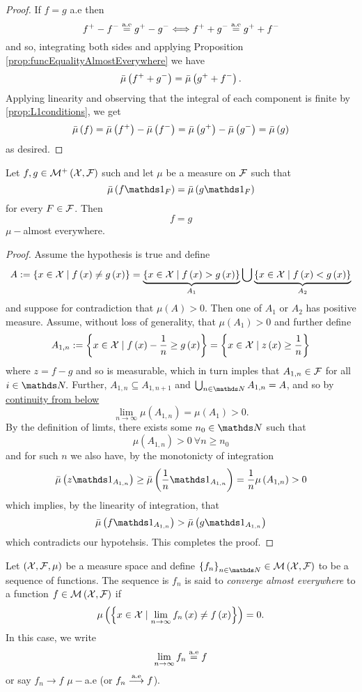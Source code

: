 \begin{proof}
If $f=g$ a.e then
\[
f^{+}-f^{-}\stackrel{\textnormal{a.e}}{=}g^{+}-g^{-}\Longleftrightarrow f^{+}+g^{-}\stackrel{\textnormal{a.e}}{=}g^{+}+f^{-}
\]
and so, integrating both sides and applying Proposition \ref{prop:funcEqualityAlmostEverywhere}
we have
\[
\bar{\mu}\left(f^{+}+g^{-}\right)=\bar{\mu}\left(g^{+}+f^{-}\right).
\]
Applying linearity and observing that the integral of each component
is finite by \ref{prop:L1conditions}, we get 
\[
\bar{\mu}\left(f\right)=\bar{\mu}\left(f^{+}\right)-\bar{\mu}\left(f^{-}\right)=\bar{\mu}\left(g^{+}\right)-\bar{\mu}\left(g^{-}\right)=\bar{\mu}\left(g\right)
\]
as desired.
\end{proof}
\begin{prop}
\label{prop:intEqualFuncEqual} Let $f,g\in\mathcal{M}^{+}\left(\mathcal{X},\mathcal{F}\right)$
such and let $\mu$ be a measure on $\mathcal{F}$ such that 
\[
\lebInt{\mu}{f\indicate_{F}}=\lebInt{\mu}{g\indicate_{F}}
\]
for every $F\in\mathcal{F}$. Then
\[
f=g
\]
$\mu-$almost everywhere.
\end{prop}

\begin{proof}
Assume the hypothesis is true and define
\[
A:=\left\{ x\in\mathcal{X}\mid f\left(x\right)\neq g\left(x\right)\right\} =\underbrace{\left\{ x\in\mathcal{X}\mid f\left(x\right)>g\left(x\right)\right\} }_{A_{1}}\bigcup\underbrace{\left\{ x\in\mathcal{X}\mid f\left(x\right)<g\left(x\right)\right\} }_{A_{2}}
\]
and suppose for contradiction that $\mu\left(A\right)>0.$ Then one
of $A_{1}$ or $A_{2}$ has positive measure. Assume, without loss
of generality, that $\mu\left(A_{1}\right)>0$ and further define
\[
A_{1,n}:=\left\{ x\in\mathcal{X}\mid f\left(x\right)-\frac{1}{n}\geq g\left(x\right)\right\} =\left\{ x\in\mathcal{X}\mid z\left(x\right)\geq\frac{1}{n}\right\} 
\]
where $z=f-g$ and so is measurable, which in turn imples that $A_{1,n}\in\mathcal{F}$
for all $i\in\N.$ Further, $A_{1,n}\subseteq A_{1,n+1}$ and $\bigcup_{n\in\N}A_{1,n}=A$,
and so by \hyperref[prop:measureProperties]{continuity from below}
\[
\lim_{n\to\infty}\mu\left(A_{1,n}\right)=\mu\left(A_{1}\right)>0.
\]
By the definition of limts, there exists some $n_{0}\in\N$ such that
\[
\mu\left(A_{1,n}\right)>0\ \forall n\geq n_{0}
\]
and for such $n$ we also have, by the monotonicty of integration
\[
\lebInt{\mu}{z\indicate_{A_{1,n}}}\geq\lebInt{\mu}{\frac{1}{n}\indicate_{A_{1,n}}}=\frac{1}{n}\mu\left(A_{1,n}\right)>0
\]
which implies, by the linearity of integration, that
\[
\lebInt{\mu}{f\indicate_{A_{1,n}}}>\lebInt{\mu}{g\indicate_{A_{1,n}}}
\]
which contradicts our hypotehsis. This completes the proof.
\end{proof}
\begin{defn}
\label{def:convAlmostEverywhere}Let $\left(\mathcal{X},\mathcal{F},\mu\right)$ be
a measure space and define $\left\{ f_{n}\right\} _{n\in\N}\in\measurableFunctions$
to be a sequence of functions. The sequence is $f_{n}$ is said to
\emph{converge almost everywhere} to a function $f\in\mathcal{M}\left(\mathcal{X},\mathcal{F}\right)$
if 
\[
\mu\left(\left\{ x\in\mathcal{X}\mid\lim_{n\to\infty}f_{n}\left(x\right)\neq f\left(x\right)\right\} \right)=0.
\]
In this case, we write
\[
\lim_{n\to\infty}f_{n}\stackrel{\textnormal{a.e}}{=}f
\]
or say $f_{n}\longrightarrow f$ $\mu-$a.e (or $f_{n}\stackrel{\textnormal{a.e}}{\longrightarrow}f$).
\end{defn}

